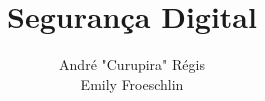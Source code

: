 \documentclass{beamer}
\title{Segurança Digital}
\author[Curupira e Emily]{André "Curupira" Régis \texorpdfstring{\\}{ }Emily Froeschlin}
\institute[MLC]{Movimento Luta de Classes}
\date{\the\year}
\begin{document}
\frame{\titlepage}





\end{document}
